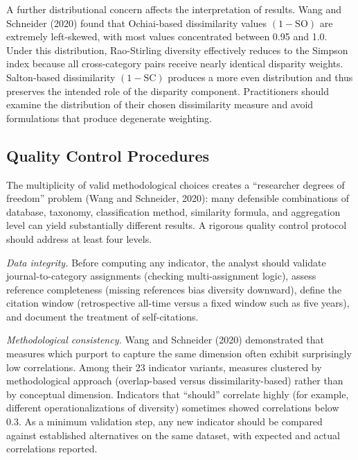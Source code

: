 \documentclass[
]{article}
\begin{document}
A further distributional concern affects the interpretation of results.
Wang and Schneider (2020) found that Ochiai-based dissimilarity values
\((1 - \text{SO})\) are extremely left-skewed, with most values
concentrated between 0.95 and 1.0. Under this distribution, Rao-Stirling
diversity effectively reduces to the Simpson index because all
cross-category pairs receive nearly identical disparity weights.
Salton-based dissimilarity \((1 - \text{SC})\) produces a more even
distribution and thus preserves the intended role of the disparity
component. Practitioners should examine the distribution of their chosen
dissimilarity measure and avoid formulations that produce degenerate
weighting.

\hypertarget{quality-control-procedures}{%
\subsection{Quality Control
Procedures}\label{quality-control-procedures}}

The multiplicity of valid methodological choices creates a ``researcher
degrees of freedom'' problem (Wang and Schneider, 2020): many defensible
combinations of database, taxonomy, classification method, similarity
formula, and aggregation level can yield substantially different
results. A rigorous quality control protocol should address at least
four levels.

\emph{Data integrity.} Before computing any indicator, the analyst
should validate journal-to-category assignments (checking
multi-assignment logic), assess reference completeness (missing
references bias diversity downward), define the citation window
(retrospective all-time versus a fixed window such as five years), and
document the treatment of self-citations.

\emph{Methodological consistency.} Wang and Schneider (2020)
demonstrated that measures which purport to capture the same dimension
often exhibit surprisingly low correlations. Among their 23 indicator
variants, measures clustered by methodological approach (overlap-based
versus dissimilarity-based) rather than by conceptual dimension.
Indicators that ``should'' correlate highly (for example, different
operationalizations of diversity) sometimes showed correlations below
0.3. As a minimum validation step, any new indicator should be compared
against established alternatives on the same dataset, with expected and
actual correlations reported.
\end{document}
